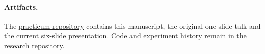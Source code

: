 \documentclass{article}
\begin{document}
\paragraph{Artifacts.}
The \href{https://github.com/YaguarEgor/my_first_article}{practicum repository} contains this manuscript, the original one-slide talk and the current six-slide presentation. Code and experiment history remain in the \href{https://github.com/YaguarEgor/diffusion_models_vector_quantization}{research repository}.
\renewcommand{\bibfont}{\small}
\setlength{\bibsep}{2pt}
\clearpage


\end{document}
